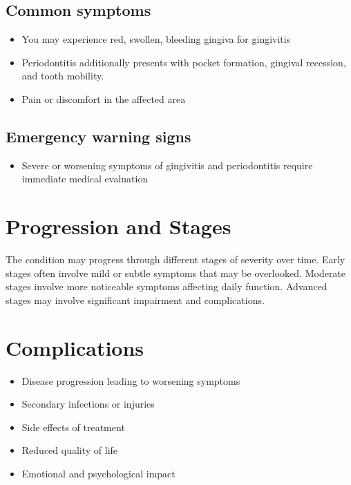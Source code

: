 \subsection{Common symptoms}
\begin{itemize}[noitemsep]
  \item You may experience red, swollen, bleeding gingiva for gingivitis
  \item Periodontitis additionally presents with pocket formation, gingival recession, and tooth mobility.
  \item Pain or discomfort in the affected area
  \end{itemize}

\subsection{Emergency warning signs}
\begin{itemize}[noitemsep]
  \item Severe or worsening symptoms of gingivitis and periodontitis require immediate medical evaluation
\end{itemize}
\section{Progression and Stages}
The condition may progress through different stages of severity over time. Early stages often involve mild or subtle symptoms that may be overlooked. Moderate stages involve more noticeable symptoms affecting daily function. Advanced stages may involve significant impairment and complications.
\section{Complications}
\begin{itemize}[noitemsep]
  \item Disease progression leading to worsening symptoms
  \item Secondary infections or injuries
  \item Side effects of treatment
  \item Reduced quality of life
  \item Emotional and psychological impact
\end{itemize}
